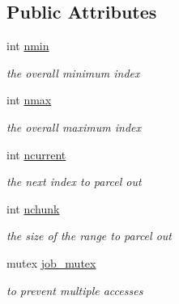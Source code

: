 \subsection*{Public Attributes}
\begin{DoxyCompactItemize}
\item 
\mbox{\label{structJob_ac0ad3904b198ae1447abd16e1108a14c}} 
int \mbox{\hyperlink{structJob_ac0ad3904b198ae1447abd16e1108a14c}{nmin}}
\begin{DoxyCompactList}\small\item\em the overall minimum index \end{DoxyCompactList}\item 
\mbox{\label{structJob_abb2b05e989a4838a3a0c5807340282ac}} 
int \mbox{\hyperlink{structJob_abb2b05e989a4838a3a0c5807340282ac}{nmax}}
\begin{DoxyCompactList}\small\item\em the overall maximum index \end{DoxyCompactList}\item 
\mbox{\label{structJob_a821370334556accb0865da81033a9775}} 
int \mbox{\hyperlink{structJob_a821370334556accb0865da81033a9775}{ncurrent}}
\begin{DoxyCompactList}\small\item\em the next index to parcel out \end{DoxyCompactList}\item 
\mbox{\label{structJob_a4fa956498fa1a349492dc9ab383b7bc4}} 
int \mbox{\hyperlink{structJob_a4fa956498fa1a349492dc9ab383b7bc4}{nchunk}}
\begin{DoxyCompactList}\small\item\em the size of the range to parcel out \end{DoxyCompactList}\item 
\mbox{\label{structJob_ac5e0baa95d1463a028e5130fc0e88709}} 
mutex \mbox{\hyperlink{structJob_ac5e0baa95d1463a028e5130fc0e88709}{job\+\_\+mutex}}
\begin{DoxyCompactList}\small\item\em to prevent multiple accesses \end{DoxyCompactList}\end{DoxyCompactItemize}


